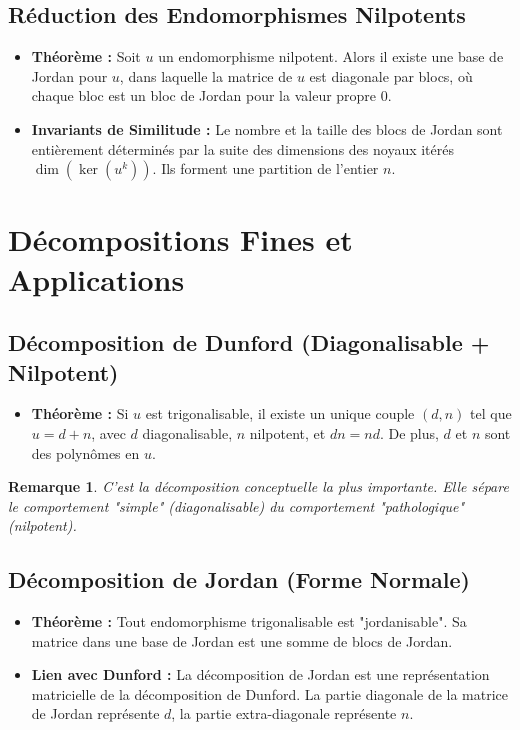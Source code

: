\documentclass[12pt, a4paper, parskip=full]{report}
\theoremstyle{agregstyle}
\newtheorem{remark}[definition]{Remarque}
\begin{document}
\subsection{Réduction des Endomorphismes Nilpotents}
\begin{itemize}
    \item \textbf{Théorème :} Soit $u$ un endomorphisme nilpotent. Alors il existe une base de Jordan pour $u$, dans laquelle la matrice de $u$ est diagonale par blocs, où chaque bloc est un bloc de Jordan pour la valeur propre 0.
    \item \textbf{Invariants de Similitude :} Le nombre et la taille des blocs de Jordan sont entièrement déterminés par la suite des dimensions des noyaux itérés $\dim(\ker(u^k))$. Ils forment une partition de l'entier $n$.
\end{itemize}

\section{Décompositions Fines et Applications}

\subsection{Décomposition de Dunford (Diagonalisable + Nilpotent)}
\begin{itemize}
    \item \textbf{Théorème :} Si $u$ est trigonalisable, il existe un unique couple $(d,n)$ tel que $u=d+n$, avec $d$ diagonalisable, $n$ nilpotent, et $dn=nd$. De plus, $d$ et $n$ sont des polynômes en $u$.
\end{itemize}
\begin{remark}
    C'est la décomposition conceptuelle la plus importante. Elle sépare le comportement "simple" (diagonalisable) du comportement "pathologique" (nilpotent).
\end{remark}

\subsection{Décomposition de Jordan (Forme Normale)}
\begin{itemize}
    \item \textbf{Théorème :} Tout endomorphisme trigonalisable est "jordanisable". Sa matrice dans une base de Jordan est une somme de blocs de Jordan.
    \item \textbf{Lien avec Dunford :} La décomposition de Jordan est une représentation matricielle de la décomposition de Dunford. La partie diagonale de la matrice de Jordan représente $d$, la partie extra-diagonale représente $n$.
\end{itemize}
\end{document}
